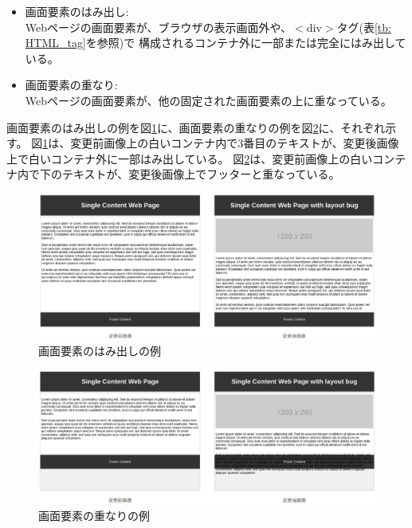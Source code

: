 \begin{itemize}
      \setlength{\itemsep}{0pt}
            \setlength{\parsep}{0pt}
      \item 画面要素のはみ出し:\\
            Webページの画面要素が、ブラウザの表示画面外や、$<$div$>$タグ(表\ref{tb: HTML_tag}を参照)で
            構成されるコンテナ外に一部または完全にはみ出している。                 
      \item 画面要素の重なり:\\
            Webページの画面要素が、他の固定された画面要素の上に重なっている。
\end{itemize}
画面要素のはみ出しの例を図\ref{fig:hamidasi}に、画面要素の重なりの例を図\ref{fig:overlap}に、それぞれ示す。
図\ref{fig:hamidasi}は、変更前画像上の白いコンテナ内で3番目のテキストが、変更後画像上で白いコンテナ外に一部はみ出している。
図\ref{fig:overlap}は、変更前画像上の白いコンテナ内で下のテキストが、変更後画像上でフッターと重なっている。
\begin{figure}[tp]
      \begin{center}
            \includegraphics[width=1.0\columnwidth]{image/2/hamidasi.png}
            \caption{画面要素のはみ出しの例}
            \label{fig:hamidasi}
      \end{center}
\end{figure}
\begin{figure}[tp]
      \begin{center}
            \includegraphics[width=1.0\columnwidth]{image/2/overlap.png}
            \caption{画面要素の重なりの例}
            \label{fig:overlap}
      \end{center}
\end{figure}
